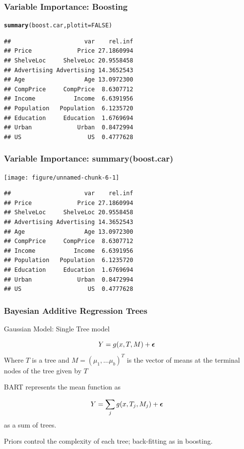 \documentclass[]{beamer}\usepackage[]{graphicx}\usepackage[]{color}
\makeatletter
\newcommand{\hlnum}[1]{\textcolor[rgb]{0.686,0.059,0.569}{#1}}%
\newcommand{\hlstd}[1]{\textcolor[rgb]{0.345,0.345,0.345}{#1}}%
\newcommand{\hlkwc}[1]{\textcolor[rgb]{0.333,0.667,0.333}{#1}}%
\newcommand{\hlkwd}[1]{\textcolor[rgb]{0.737,0.353,0.396}{\textbf{#1}}}%
\newenvironment{kframe}{%
 \def\at@end@of@kframe{}%
 \ifinner\ifhmode%
  \def\at@end@of@kframe{\end{minipage}}%
  \begin{minipage}{\columnwidth}%
 \fi\fi%
 \def\FrameCommand##1{\hskip\@totalleftmargin \hskip-\fboxsep
 \colorbox{shadecolor}{##1}\hskip-\fboxsep
     \hskip-\linewidth \hskip-\@totalleftmargin \hskip\columnwidth}%
 \MakeFramed {\advance\hsize-\width
   \@totalleftmargin\z@ \linewidth\hsize
   \@setminipage}}%
 {\par\unskip\endMakeFramed%
 \at@end@of@kframe}
\newenvironment{knitrout}{}{} %
\makeatother
\begin{document}
\begin{frame}[fragile]  \frametitle{Variable Importance: Boosting}
\begin{knitrout}
\color{fgcolor}\begin{kframe}
\begin{alltt}
\hlkwd{summary}\hlstd{(boost.car,} \hlkwc{plotit}\hlstd{=}\hlnum{FALSE}\hlstd{)}
\end{alltt}
\begin{verbatim}
##                     var    rel.inf
## Price             Price 27.1860994
## ShelveLoc     ShelveLoc 20.9558458
## Advertising Advertising 14.3652543
## Age                 Age 13.0972300
## CompPrice     CompPrice  8.6307712
## Income           Income  6.6391956
## Population   Population  6.1235720
## Education     Education  1.6769694
## Urban             Urban  0.8472994
## US                   US  0.4777628
\end{verbatim}
\end{kframe}
\end{knitrout}
\end{frame}

\begin{frame}[fragile] \frametitle{Variable Importance: summary(boost.car)}
\begin{knitrout}
\color{fgcolor}

{\centering \texttt{[image: figure/unnamed-chunk-6-1]} 

}


\begin{kframe}\begin{verbatim}
##                     var    rel.inf
## Price             Price 27.1860994
## ShelveLoc     ShelveLoc 20.9558458
## Advertising Advertising 14.3652543
## Age                 Age 13.0972300
## CompPrice     CompPrice  8.6307712
## Income           Income  6.6391956
## Population   Population  6.1235720
## Education     Education  1.6769694
## Urban             Urban  0.8472994
## US                   US  0.4777628
\end{verbatim}
\end{kframe}
\end{knitrout}
\end{frame}


\begin{frame}
  \frametitle{Bayesian Additive Regression Trees}
Gaussian Model:  Single Tree model

$$
Y = g(x, T, M) + \boldsymbol{\epsilon}
$$
Where $T$ is a tree and $M= (\mu_1, \ldots \mu_b)^T$ is the vector of means at the terminal nodes of the tree given by $T$  \pause

\vspace{12pt}
BART represents the mean function as

$$
Y =\sum_j  g(x, T_j, M_j) + \boldsymbol{\epsilon}
$$
as a sum of trees. \pause


Priors control the complexity of each tree; back-fitting as in boosting. \pause

\end{frame}
\end{document}
